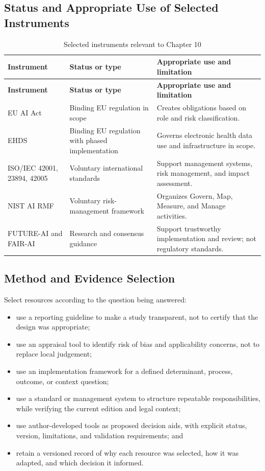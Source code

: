 \subsection{Status and Appropriate Use of Selected Instruments}
\begin{longtable}{@{}p{}p{}p{}@{}}
\caption{Selected instruments relevant to Chapter 10}
\label{tab:comp-ch10-instrument-status}\\
\toprule
\textbf{Instrument} & \textbf{Status or type} & \textbf{Appropriate use and limitation} \\
\midrule
\endfirsthead
\toprule
\textbf{Instrument} & \textbf{Status or type} & \textbf{Appropriate use and limitation} \\
\midrule
\endhead
\bottomrule
\endlastfoot
EU AI Act & Binding EU regulation in scope & Creates obligations based on role and risk classification. \\
EHDS & Binding EU regulation with phased implementation & Governs electronic health data use and infrastructure in scope. \\
ISO/IEC 42001, 23894, 42005 & Voluntary international standards & Support management systems, risk management, and impact assessment. \\
NIST AI RMF & Voluntary risk-management framework & Organizes Govern, Map, Measure, and Manage activities. \\
FUTURE-AI and FAIR-AI & Research and consensus guidance & Support trustworthy implementation and review; not regulatory standards. \\
\end{longtable}

\subsection{Method and Evidence Selection}
Select resources according to the question being answered:
\begin{itemize}
 \item use a reporting guideline to make a study transparent, not to certify that the design was appropriate;
 \item use an appraisal tool to identify risk of bias and applicability concerns, not to replace local judgement;
 \item use an implementation framework for a defined determinant, process, outcome, or context question;
 \item use a standard or management system to structure repeatable responsibilities, while verifying the current edition and legal context;
 \item use author-developed tools as proposed decision aids, with explicit status, version, limitations, and validation requirements; and
 \item retain a versioned record of why each resource was selected, how it was adapted, and which decision it informed.
\end{itemize}

